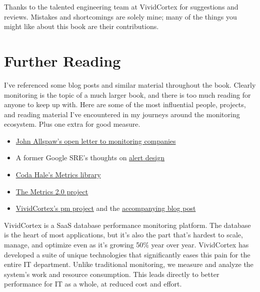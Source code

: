 \documentclass{vivid_layout}
\begin{document}
Thanks to the talented engineering team at VividCortex for suggestions and
reviews. Mistakes and shortcomings are solely mine; many of the things you might
like about this book are their contributions.

\section{Further Reading}

I've referenced some blog posts and similar material throughout the book.
Clearly monitoring is the topic of a much larger book, and there is too much
reading for anyone to keep up with. Here are some of the most influential
people, projects, and reading material I've encountered in my journeys around
the monitoring ecosystem. Plus one extra for good measure.

\begin{itemize}
\item \href{http://www.kitchensoap.com/2015/05/01/openlettertomonitoringproducts/}{John Allspaw's open letter to monitoring companies}
\item A former Google SRE's thoughts on
\href{https://docs.google.com/document/d/199PqyG3UsyXlwieHaqbGiWVa8eMWi8zzAn0YfcApr8Q/edit}{alert
design}
\item \href{http://metrics.dropwizard.io/}{Coda Hale's Metrics library}
\item \href{http://metrics20.org/}{The Metrics 2.0 project}
\item \href{https://github.com/VividCortex/pm}{VividCortex's pm project} and the
\href{https://www.vividcortex.com/blog/2014/11/06/inside-distributed-architecture/}{accompanying
blog post}
\end{itemize}

\newpage

\begin{about}	%
VividCortex is a SaaS database performance monitoring platform. The database is the heart of most applications, but it's also the part that's hardest to scale, manage, and optimize even as it's growing 50\% year over year. VividCortex has developed a suite of unique technologies that significantly eases this pain for the entire IT department. Unlike traditional monitoring, we measure
and analyze the system's work and resource consumption. This leads directly to better performance for IT as a whole, at reduced cost and effort.
\end{about}
\makeresources	%
\end{document}
